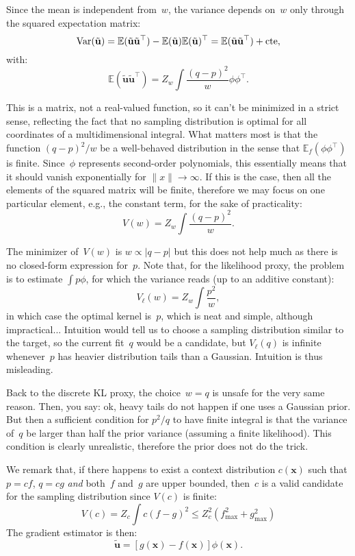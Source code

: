 \documentclass{article}
\def\x{\mathbf{x}}
\def\u{\mathbf{u}}
\def\E{\mathbb{E}}
\begin{document}
Since the mean is independent from~$w$, the variance depends on~$w$ only through the squared expectation matrix:
$$
\text{Var}(\tilde{\u}) 
= \E(\tilde{\u}\tilde{\u}^\top) - \E(\tilde{\u})\E(\tilde{\u})^\top
= \E(\tilde{\u}\tilde{\u}^\top) + {\rm cte},
$$
with:
$$
\E(\tilde{\u}\tilde{\u}^\top) = Z_w \int\frac{(q-p)^2}{w}\phi\phi^\top.
$$

This is a matrix, not a real-valued function, so it can't be minimized in a strict sense, reflecting the fact that no sampling distribution is optimal for all coordinates of a multidimensional integral. What matters most is that the function $(q-p)^2/w$ be a well-behaved distribution in the sense that  $\E_f(\phi\phi^\top)$ is finite. Since~$\phi$ represents second-order polynomials, this essentially means that it should vanish exponentially for $\|x\|\to\infty$. If this is the case, then all the elements of the squared matrix will be finite, therefore we may focus on one particular element, e.g., the constant term, for the sake of practicality:
$$
V(w) = Z_w \int\frac{(q-p)^2}{w}.
$$

The minimizer of~$V(w)$ is $w\propto |q-p|$ but this does not help much as there is no closed-form expression for~$p$. Note that, for the likelihood proxy, the problem is to estimate $\int p\phi$, for which the variance reads (up to an additive constant):
$$
V_{\ell}(w) = Z_w \int \frac{p^2}{w},
$$
in which case the optimal kernel is~$p$, which is neat and simple, although impractical... Intuition would tell us to choose a sampling distribution similar to the target, so the current fit~$q$ would be a candidate, but $V_\ell(q)$ is infinite whenever~$p$ has heavier distribution tails than a Gaussian. Intuition is thus misleading.

Back to the discrete KL proxy, the choice~$w=q$ is unsafe for the very same reason. Then, you say: ok, heavy tails do not happen if one uses a Gaussian prior. But then a sufficient condition for $p^2/q$ to have finite integral is that the variance of~$q$ be larger than half the prior variance (assuming a finite likelihood). This condition is clearly unrealistic, therefore the prior does not do the trick. 

We remark that, if there happens to exist a context distribution $c(\x)$ such that $p=cf$, $q=cg$ {\em and} both~$f$ and~$g$ are upper bounded, then~$c$ is a valid candidate for the sampling distribution since $V(c)$ is finite:
$$
V(c)= Z_c \int c (f-g)^2 \leq Z_c^2 (f_{\max}^2 + g_{\max}^2) 
$$ 
The gradient estimator is then:
$$
\tilde{\u} = [g(\x)-f(\x)] \phi(\x).
$$
\end{document}
